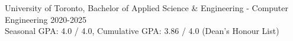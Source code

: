 University of Toronto, Bachelor of Applied Science \& Engineering - Computer Engineering \hfill{2020-2025}
\\ Seasonal GPA: 4.0 / 4.0, Cumulative GPA: 3.86 / 4.0 (Dean’s Honour List)